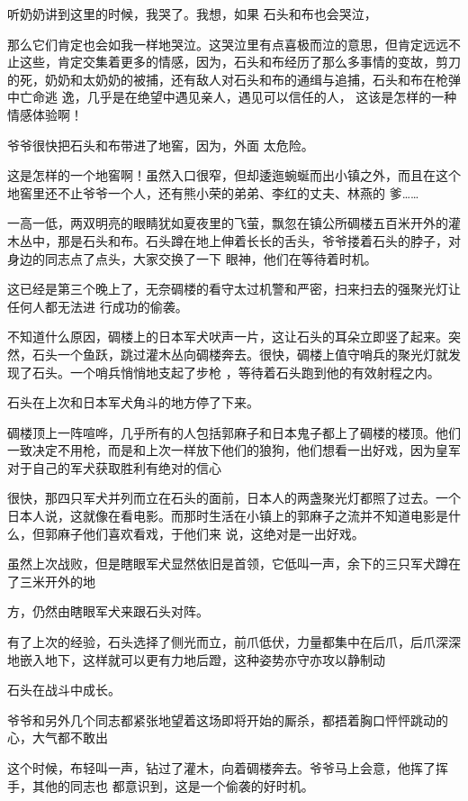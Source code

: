 \documentclass{article}
\begin{document}
听奶奶讲到这里的时候，我哭了。我想，如果
石头和布也会哭泣， 

那么它们肯定也会如我一样地哭泣。这哭泣里有点喜极而泣的意思，但肯定远远不止这些，肯定交集着更多的情感，因为，石头和布经历了那么多事情的变故，剪刀的死，奶奶和太奶奶的被捕，还有敌人对石头和布的通缉与追捕，石头和布在枪弹中亡命逃
\newpage
逸，几乎是在绝望中遇见亲人，遇见可以信任的人，
这该是怎样的一种情感体验啊！ 

爷爷很快把石头和布带进了地窖，因为，外面
太危险。 

这是怎样的一个地窖啊！虽然入口很窄，但却逶迤蜿蜒而出小镇之外，而且在这个地窖里还不止爷爷一个人，还有熊小荣的弟弟、李红的丈夫、林燕的
爹…… 

一高一低，两双明亮的眼睛犹如夏夜里的飞萤，飘忽在镇公所碉楼五百米开外的灌木丛中，那是石头和布。石头蹲在地上伸着长长的舌头，爷爷搂着石头的脖子，对身边的同志点了点头，大家交换了一下
眼神，他们在等待着时机。 

这已经是第三个晚上了，无奈碉楼的看守太过机警和严密，扫来扫去的强聚光灯让任何人都无法进
行成功的偷袭。 

\newpage

不知道什么原因，碉楼上的日本军犬吠声一片，这让石头的耳朵立即竖了起来。突然，石头一个鱼跃，跳过灌木丛向碉楼奔去。很快，碉楼上值守哨兵的聚光灯就发现了石头。一个哨兵悄悄地支起了步枪
，等待着石头跑到他的有效射程之内。 

石头在上次和日本军犬角斗的地方停了下来。

碉楼顶上一阵喧哗，几乎所有的人包括郭麻子和日本鬼子都上了碉楼的楼顶。他们一致决定不用枪，而是和上次一样放下他们的狼狗，他们想看一出好戏，因为皇军对于自己的军犬获取胜利有绝对的信心

很快，那四只军犬并列而立在石头的面前，日本人的两盏聚光灯都照了过去。一个日本人说，这就像在看电影。而那时生活在小镇上的郭麻子之流并不知道电影是什么，但郭麻子他们喜欢看戏，于他们来
说，这绝对是一出好戏。 

虽然上次战败，但是瞎眼军犬显然依旧是首领，它低叫一声，余下的三只军犬蹲在了三米开外的地
\newpage

方，仍然由瞎眼军犬来跟石头对阵。 

有了上次的经验，石头选择了侧光而立，前爪低伏，力量都集中在后爪，后爪深深地嵌入地下，这样就可以更有力地后蹬，这种姿势亦守亦攻以静制动


石头在战斗中成长。 

爷爷和另外几个同志都紧张地望着这场即将开始的厮杀，都捂着胸口怦怦跳动的心，大气都不敢出

这个时候，布轻叫一声，钻过了灌木，向着碉楼奔去。爷爷马上会意，他挥了挥手，其他的同志也
都意识到，这是一个偷袭的好时机。 
\end{document}
